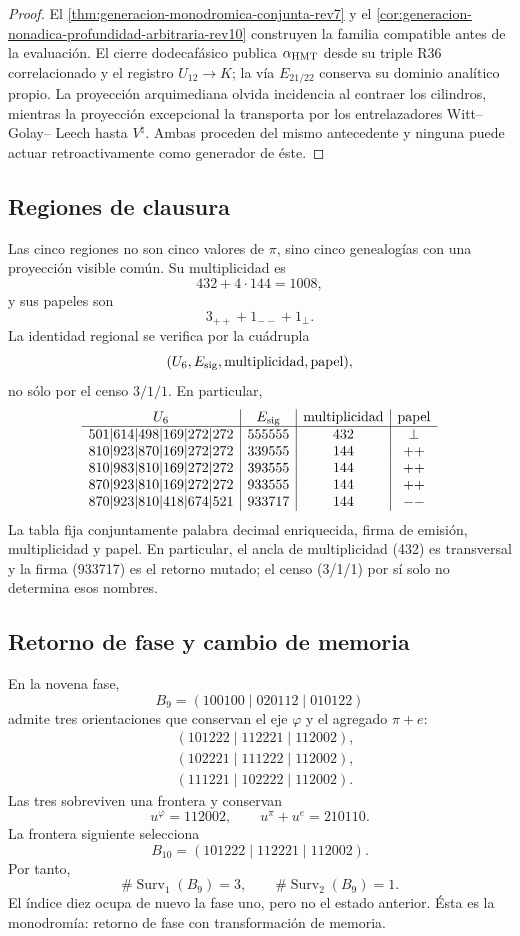 \begin{proof}
El \cref{thm:generacion-monodromica-conjunta-rev7} y el
\cref{cor:generacion-nonadica-profundidad-arbitraria-rev10} construyen la
familia compatible antes de la evaluación. El cierre dodecafásico publica
\(\alpha_{\rm HMT}\) desde su triple R36 correlacionado y el registro
\(U_{12}\to K\); la vía
\(E_{21/22}\) conserva su dominio analítico propio. La proyección
arquimediana olvida incidencia al contraer los cilindros, mientras la
proyección excepcional la transporta por los entrelazadores Witt--Golay--
Leech hasta \(V^\natural\). Ambas proceden del mismo antecedente y ninguna
puede actuar retroactivamente como generador de éste.
\end{proof}

\subsection{Regiones de clausura}

Las cinco regiones no son cinco valores de \(\pi\), sino cinco genealogías
con una proyección visible común. Su multiplicidad es
\[
 432+4\cdot144=1008,
\]
y sus papeles son
\[
 3_{++}+1_{--}+1_{\perp}.
\]
La identidad regional se verifica por la cuádrupla
\[
 (U_6,E_{\rm sig},\text{multiplicidad},\text{papel}),
\]
no sólo por el censo \(3/1/1\). En particular,
\[
\begin{array}{c|c|c|c}
U_6&E_{\rm sig}&\text{multiplicidad}&\text{papel}\\ \hline
501|614|498|169|272|272&555555&432&\perp\\
810|923|870|169|272|272&339555&144&++\\
810|983|810|169|272|272&393555&144&++\\
870|923|810|169|272|272&933555&144&++\\
870|923|810|418|674|521&933717&144&--
\end{array}
\]
La tabla fija conjuntamente palabra decimal enriquecida, firma de emisión,
multiplicidad y papel. En particular, el ancla de multiplicidad (432) es
transversal y la firma (933717) es el retorno mutado; el censo (3/1/1)
por sí solo no determina esos nombres.

\subsection{Retorno de fase y cambio de memoria}

En la novena fase,
\[
 B_9=(100100\mid020112\mid010122)
\]
admite tres orientaciones que conservan el eje \(\varphi\) y el agregado
\(\pi+e\):
\[
\begin{aligned}
 &(101222\mid112221\mid112002),\\
 &(102221\mid111222\mid112002),\\
 &(111221\mid102222\mid112002).
\end{aligned}
\]
Las tres sobreviven una frontera y conservan
\[
 u^{\varphi}=112002,
 \qquad u^\pi+u^e=210110.
\]
La frontera siguiente selecciona
\[
 B_{10}=(101222\mid112221\mid112002).
\]
Por tanto,
\[
 \#\operatorname{Surv}_1(B_9)=3,
 \qquad
 \#\operatorname{Surv}_2(B_9)=1.
\]
El índice diez ocupa de nuevo la fase uno, pero no el estado anterior. Ésta
es la monodromía: retorno de fase con transformación de memoria.

